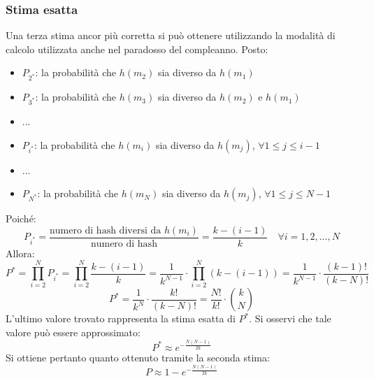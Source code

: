 \subsubsection{Stima esatta}

Una terza stima ancor più corretta si può ottenere utilizzando la modalità di calcolo utilizzata anche nel paradosso del compleanno. Posto:
\begin{itemize}
\item $P_{2^{*}}$: la probabilità che $h(m_2)$ sia diverso da $h(m_1)$
\item $P_{3^{*}}$: la probabilità che $h(m_3)$ sia diverso da $h(m_2)$ e $h(m_1)$
\item ...
\item $P_{i^{*}}$: la probabilità che $h(m_i)$ sia diverso da $h(m_j)$, $\forall 1\leq j \leq i-1$
\item ...
\item $P_{N^{*}}$: la probabilità che $h(m_N)$ sia diverso da $h(m_j)$, $\forall 1\leq j \leq N-1$
\end{itemize}
Poiché:
\begin{equation}
P_{i^{*}} = \frac{\text{numero di hash diversi da } h(m_i)}{\text{numero di hash}} = \frac{k - (i - 1)}{k} \quad \forall i = 1,2,...,N
\end{equation}
Allora:
\begin{equation}
P^{*}= \prod_{i=2}^N P_{i^{*}} = \prod_{i=2}^N \frac{k - (i - 1)}{k} = \frac{1}{k^{N - 1}} \cdot \prod_{i=2}^N (k - (i - 1)) = \frac{1}{k^{N - 1}} \cdot \frac{(k - 1)!}{(k - N)!} 
\end{equation}
\begin{equation}
P^{*} =  \frac{1}{k^{N}} \cdot \frac{k!}{(k - N)!} =  \frac{N!}{k!} \cdot \binom {k}{N}
\end{equation}
L'ultimo valore trovato rappresenta la stima esatta di $P^{*}$. Si osservi che tale valore può essere approssimato:
\begin{equation}
P^{*} \approx e^{-\frac{N(N-1)}{2k}}
\end{equation}
Si ottiene pertanto quanto ottenuto tramite la seconda stima:
\begin{equation}
P \approx 1 - e^{-\frac{N(N-1)}{2k}}
\end{equation}

